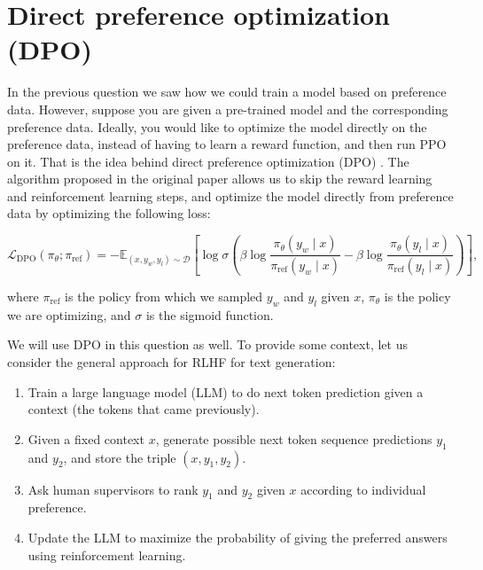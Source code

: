 \section{Direct preference optimization (DPO)}

In the previous question we saw how we could train a model based on preference data. However, suppose you are given a pre-trained model and the corresponding preference data. Ideally, you would like to optimize the model directly on the preference data, instead of having to learn a reward function, and then run PPO on it. That is the idea behind direct preference optimization (DPO) \cite{NEURIPS2023_a85b405e}. The algorithm proposed in the original paper allows us to skip the reward learning and reinforcement learning steps, and optimize the model directly from preference data by optimizing the following loss:

$$\mathcal{L}_{\mathrm{DPO}}\left(\pi_\theta ; \pi_{\mathrm{ref}}\right)=-\mathbb{E}_{\left(x, y_w, y_l\right) \sim \mathcal{D}}\left[\log \sigma\left(\beta \log \frac{\pi_\theta\left(y_w \mid x\right)}{\pi_{\mathrm{ref}}\left(y_w \mid x\right)}-\beta \log \frac{\pi_\theta\left(y_l \mid x\right)}{\pi_{\mathrm{ref}}\left(y_l \mid x\right)}\right)\right],$$

where $\pi_{\mathrm{ref}}$ is the policy from which we sampled $y_w$ and $y_l$ given $x$, $\pi_\theta$ is the policy we are optimizing, and $\sigma$ is the sigmoid function.

We will use DPO in this question as well.
To provide some context, let us consider the general approach for RLHF for text generation:

\begin{enumerate}
    \item Train a large language model (LLM) to do next token prediction given a context (the tokens that came previously).
    \item Given a fixed context $x$, generate possible next token sequence predictions $y_1$ and $y_2$, and store the triple $(x, y_1, y_2)$.
    \item Ask human supervisors to rank $y_1$ and $y_2$ given $x$ according to individual preference.
    \item Update the LLM to maximize the probability of giving the preferred answers using reinforcement learning.
\end{enumerate}


